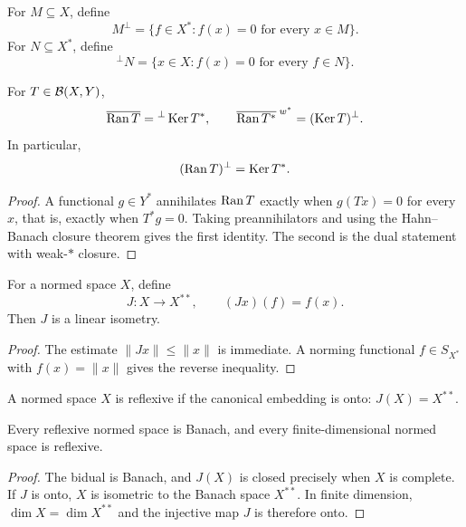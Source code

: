 \begin{notedefinition}[Annihilators]
For $M\subseteq X$, define
\[
  M^\perp=\{f\in X^*:f(x)=0\text{ for every }x\in M\}.
\]
For $N\subseteq X^*$, define
\[
  {}^\perp N=\{x\in X:f(x)=0\text{ for every }f\in N\}.
\]
\end{notedefinition}

\begin{notetheorem}
For $T\in\mathcal{B}(X,Y)$,
\[
  \overline{\operatorname{Ran} T}={}^\perp\operatorname{Ker} T^*,
  \qquad
  \overline{\operatorname{Ran} T^*}^{\;w^*}=(\operatorname{Ker} T)^\perp.
\]
In particular,
\[
  (\operatorname{Ran} T)^\perp=\operatorname{Ker} T^*.
\]
\end{notetheorem}

\begin{proof}
A functional $g\in Y^*$ annihilates $\operatorname{Ran} T$ exactly when
$g(Tx)=0$ for every $x$, that is, exactly when $T^*g=0$.  Taking
preannihilators and using the Hahn--Banach closure theorem gives the first
identity.  The second is the dual statement with weak-$*$ closure.
\end{proof}

\begin{notedefinition}
For a normed space $X$, define
\[
  J\colon X\to X^{**},
  \qquad
  (Jx)(f)=f(x).
\]
Then $J$ is a linear isometry.
\end{notedefinition}

\begin{proof}
The estimate $\|Jx\|\le\|x\|$ is immediate.  A norming functional
$f\in S_{X^*}$ with $f(x)=\|x\|$ gives the reverse inequality.
\end{proof}

\begin{notedefinition}
A normed space $X$ is reflexive if the canonical embedding is onto:
$J(X)=X^{**}$.
\end{notedefinition}

\begin{notetheorem}
Every reflexive normed space is Banach, and every finite-dimensional normed
space is reflexive.
\end{notetheorem}

\begin{proof}
The bidual is Banach, and $J(X)$ is closed precisely when $X$ is complete.
If $J$ is onto, $X$ is isometric to the Banach space $X^{**}$.  In finite
dimension, $\dim X=\dim X^{**}$ and the injective map $J$ is therefore onto.
\end{proof}

